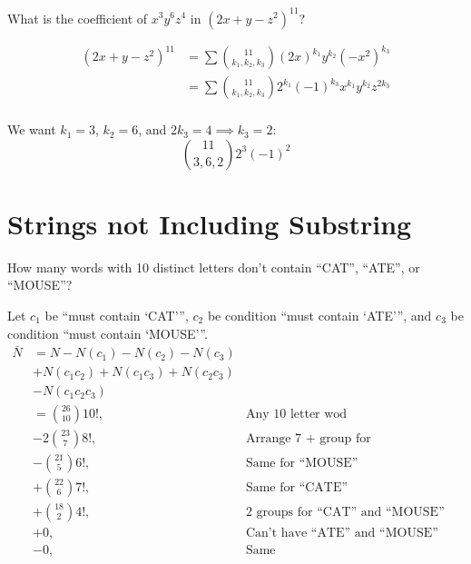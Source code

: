 \documentclass{article}
\begin{document}
    What is the coefficient of $x^3y^6z^4$ in $(2x + y - z^2)^{11}$?

    \begin{align*}
        (2x + y - z^2)^{11} & = \sum{{11 \choose k_1, k_2, k_3}(2x)^{k_1}y^{k_2}(-x^2)^{k_3}} \\
        & = \sum{{11 \choose k_1, k_2, k_3}2^{k_1}(-1)^{k_3}x^{k_1}y^{k_2}z^{2k_3}} \\
    \end{align*}

    We want $k_1 = 3$, $k_2 = 6$, and $2k_3 = 4 \implies k_3 = 2$: $${11 \choose 3, 6, 2}2^3(-1)^2$$

    \section{Strings not Including Substring}

    How many words with 10 distinct letters don't contain ``CAT'', ``ATE'', or ``MOUSE''?
    
    Let $c_1$ be ``must contain `CAT''', $c_2$ be condition ``must contain `ATE''', and $c_3$ be condition ``must contain `MOUSE'''. $$\begin{aligned}
        \bar{N} & = N - N(c_1) - N(c_2) - N(c_3) \\
        & + N(c_1c_2) + N(c_1c_3) + N(c_2c_3) \\
        & - N(c_1c_2c_3) \\
        & = {26 \choose 10}10!, & \text{Any 10 letter wod} \\
        & - 2{23 \choose 7}8!, & \text{Arrange 7 + group for ``CAT''/``ATE''} \\
        & - {21 \choose 5}6!, & \text{Same for ``MOUSE''} \\
        & + {22 \choose 6}7!, & \text{Same for ``CATE''} \\
        & + {18 \choose 2}4!, & \text{2 groups for ``CAT'' and ``MOUSE''} \\
        & + 0, & \text{Can't have ``ATE'' and ``MOUSE''} \\
        & - 0, & \text{Same}
    \end{aligned}$$
\end{document}
